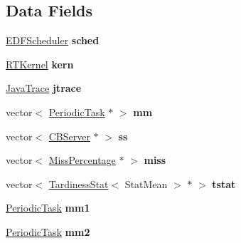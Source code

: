 \subsection*{Data Fields}
\begin{DoxyCompactItemize}
\item 
\hyperlink{classRTSim_1_1EDFScheduler}{E\+D\+F\+Scheduler} {\bfseries sched}\hypertarget{classSystem_a8056330ccd4dc018fb9ba14f18fab408}{}\label{classSystem_a8056330ccd4dc018fb9ba14f18fab408}

\item 
\hyperlink{classRTSim_1_1RTKernel}{R\+T\+Kernel} {\bfseries kern}\hypertarget{classSystem_aa8ca367ac9d124575fe479ea7f6952f0}{}\label{classSystem_aa8ca367ac9d124575fe479ea7f6952f0}

\item 
\hyperlink{classRTSim_1_1JavaTrace}{Java\+Trace} {\bfseries jtrace}\hypertarget{classSystem_a14be01a14c493f6f1a8b93dc30af5bbe}{}\label{classSystem_a14be01a14c493f6f1a8b93dc30af5bbe}

\item 
vector$<$ \hyperlink{classRTSim_1_1PeriodicTask}{Periodic\+Task} $\ast$ $>$ {\bfseries mm}\hypertarget{classSystem_a84ef762f5cb617a9680f15a3edbbf779}{}\label{classSystem_a84ef762f5cb617a9680f15a3edbbf779}

\item 
vector$<$ \hyperlink{classRTSim_1_1CBServer}{C\+B\+Server} $\ast$ $>$ {\bfseries ss}\hypertarget{classSystem_a64b50c8587599c80d900c23e6b3404fb}{}\label{classSystem_a64b50c8587599c80d900c23e6b3404fb}

\item 
vector$<$ \hyperlink{classRTSim_1_1MissPercentage}{Miss\+Percentage} $\ast$ $>$ {\bfseries miss}\hypertarget{classSystem_ae39d71a195e504167e472570eb300c22}{}\label{classSystem_ae39d71a195e504167e472570eb300c22}

\item 
vector$<$ \hyperlink{classRTSim_1_1TardinessStat}{Tardiness\+Stat}$<$ Stat\+Mean $>$ $\ast$ $>$ {\bfseries tstat}\hypertarget{classSystem_aaa3f925027a00f7994e5f5dff422b90e}{}\label{classSystem_aaa3f925027a00f7994e5f5dff422b90e}

\item 
\hyperlink{classRTSim_1_1PeriodicTask}{Periodic\+Task} {\bfseries mm1}\hypertarget{classSystem_a87b23b50b85d67b7da6d10fe8084e2f9}{}\label{classSystem_a87b23b50b85d67b7da6d10fe8084e2f9}

\item 
\hyperlink{classRTSim_1_1PeriodicTask}{Periodic\+Task} {\bfseries mm2}\hypertarget{classSystem_a90225ac3019dcbb58b956b8c4b772012}{}\label{classSystem_a90225ac3019dcbb58b956b8c4b772012}


\end{DoxyCompactItemize}
